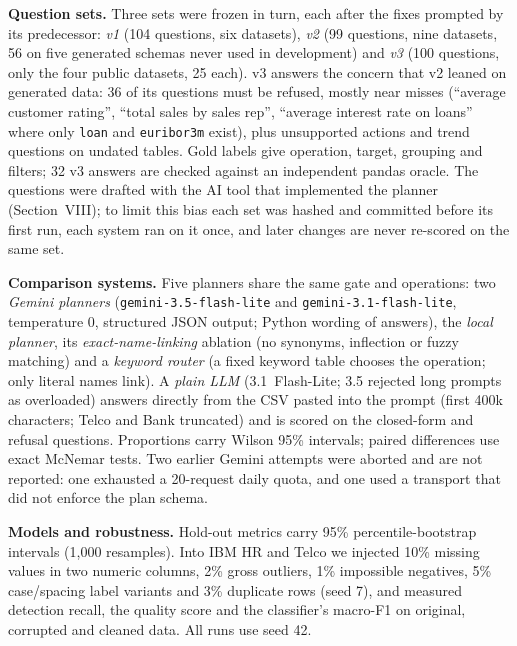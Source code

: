 \documentclass[conference]{IEEEtran}
\begin{document}
\textbf{Question sets.} Three sets were frozen in turn, each after the fixes prompted by its predecessor: \emph{v1} (104 questions, six datasets), \emph{v2} (99 questions, nine datasets, 56 on five generated schemas never used in development) and \emph{v3} (100 questions, only the four public datasets, 25 each). v3 answers the concern that v2 leaned on generated data: 36 of its questions must be refused, mostly near misses (``average customer rating'', ``total sales by sales rep'', ``average interest rate on loans'' where only \texttt{loan} and \texttt{euribor3m} exist), plus unsupported actions and trend questions on undated tables. Gold labels give operation, target, grouping and filters; 32 v3 answers are checked against an independent pandas oracle. The questions were drafted with the AI tool that implemented the planner (Section~VIII); to limit this bias each set was hashed and committed before its first run, each system ran on it once, and later changes are never re-scored on the same set.

\textbf{Comparison systems.} Five planners share the same gate and operations: two \emph{Gemini planners} (\texttt{gemini-3.5-flash-lite} and \texttt{gemini-3.1-flash-lite}, temperature 0, structured JSON output; Python wording of answers), the \emph{local planner}, its \emph{exact-name-linking} ablation (no synonyms, inflection or fuzzy matching) and a \emph{keyword router} (a fixed keyword table chooses the operation; only literal names link). A \emph{plain LLM} (3.1~Flash-Lite; 3.5 rejected long prompts as overloaded) answers directly from the CSV pasted into the prompt (first 400k characters; Telco and Bank truncated) and is scored on the closed-form and refusal questions. Proportions carry Wilson 95\% intervals; paired differences use exact McNemar tests. Two earlier Gemini attempts were aborted and are not reported: one exhausted a 20-request daily quota, and one used a transport that did not enforce the plan schema.

\textbf{Models and robustness.} Hold-out metrics carry 95\% percentile-bootstrap intervals (1,000 resamples). Into IBM HR and Telco we injected 10\% missing values in two numeric columns, 2\% gross outliers, 1\% impossible negatives, 5\% case/spacing label variants and 3\% duplicate rows (seed 7), and measured detection recall, the quality score and the classifier's macro-F1 on original, corrupted and cleaned data. All runs use seed 42.
\end{document}
